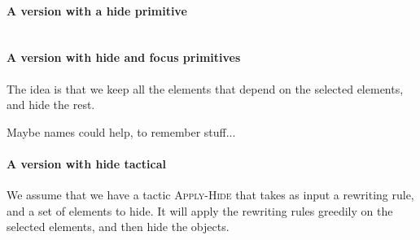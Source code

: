 \documentclass{article}
\begin{document}
\paragraph{A version with a hide primitive}
\pagebreak
\[

\]
\paragraph{A version with hide and focus primitives}
The idea is that we keep all the elements that depend on the selected elements, and hide the rest.
\pagebreak
\[

\]

Maybe names could help, to remember stuff...
\paragraph{A version with hide tactical}
We assume that we have a tactic \textsc{Apply-Hide} that takes as input 
a rewriting rule, and a set of elements to hide.
It will apply the rewriting rules greedily on the selected elements,
and then hide the objects.
\[

\]
\end{document}
